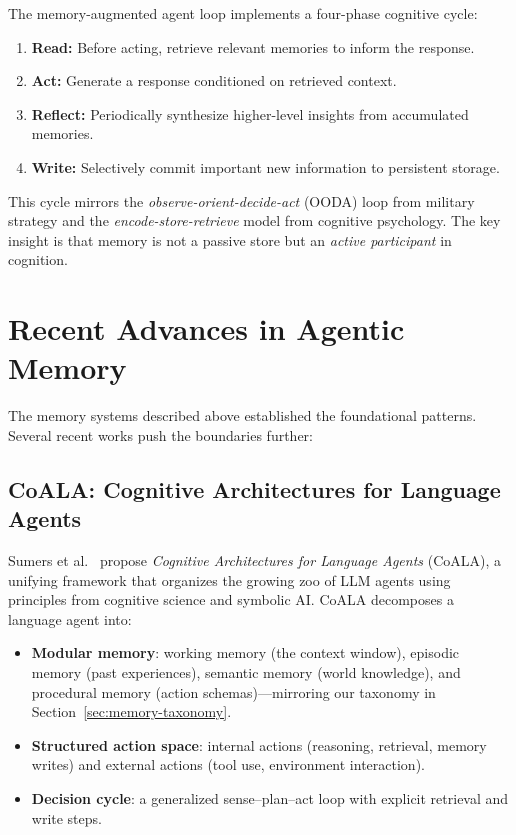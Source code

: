 \begin{intuitionbox}
The memory-augmented agent loop implements a four-phase cognitive cycle:

\begin{enumerate}
  \item \textbf{Read:} Before acting, retrieve relevant memories to inform the response.
  \item \textbf{Act:} Generate a response conditioned on retrieved context.
  \item \textbf{Reflect:} Periodically synthesize higher-level insights from accumulated memories.
  \item \textbf{Write:} Selectively commit important new information to persistent storage.
\end{enumerate}

This cycle mirrors the \emph{observe-orient-decide-act} (OODA) loop from military strategy and the \emph{encode-store-retrieve} model from cognitive psychology. The key insight is that memory is not a passive store but an \emph{active participant} in cognition.
\end{intuitionbox}

\section{Recent Advances in Agentic Memory}
\label{sec:memory-recent}

The memory systems described above established the foundational patterns. Several recent works push the boundaries further:

\subsection{CoALA: Cognitive Architectures for Language Agents}
\label{coala-cognitive-architectures-for-language-agents}

Sumers et al.~\cite{sumers2023coala} propose \emph{Cognitive Architectures for Language Agents} (CoALA), a unifying framework that organizes the growing zoo of LLM agents using principles from cognitive science and symbolic AI. CoALA decomposes a language agent into:

\begin{itemize}
  \item \textbf{Modular memory}: working memory (the context window), episodic memory (past experiences), semantic memory (world knowledge), and procedural memory (action schemas)---mirroring our taxonomy in Section~\ref{sec:memory-taxonomy}.
  \item \textbf{Structured action space}: internal actions (reasoning, retrieval, memory writes) and external actions (tool use, environment interaction).
  \item \textbf{Decision cycle}: a generalized sense--plan--act loop with explicit retrieval and write steps.
\end{itemize}

